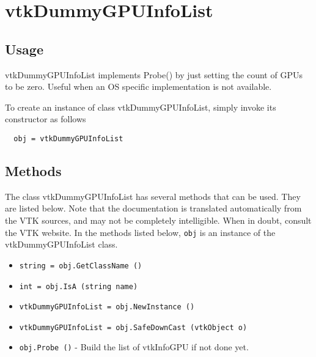 \section{vtkDummyGPUInfoList}

\subsection{Usage}

 vtkDummyGPUInfoList implements Probe() by just setting the count of
 GPUs to be zero. Useful when an OS specific implementation is not available.

To create an instance of class vtkDummyGPUInfoList, simply
invoke its constructor as follows
\begin{verbatim}
  obj = vtkDummyGPUInfoList
\end{verbatim}
\subsection{Methods}

The class vtkDummyGPUInfoList has several methods that can be used.
  They are listed below.
Note that the documentation is translated automatically from the VTK sources,
and may not be completely intelligible.  When in doubt, consult the VTK website.
In the methods listed below, \verb|obj| is an instance of the vtkDummyGPUInfoList class.
\begin{itemize}
\item  \verb|string = obj.GetClassName ()|

\item  \verb|int = obj.IsA (string name)|

\item  \verb|vtkDummyGPUInfoList = obj.NewInstance ()|

\item  \verb|vtkDummyGPUInfoList = obj.SafeDownCast (vtkObject o)|

\item  \verb|obj.Probe ()| -  Build the list of vtkInfoGPU if not done yet.
 

\end{itemize}
